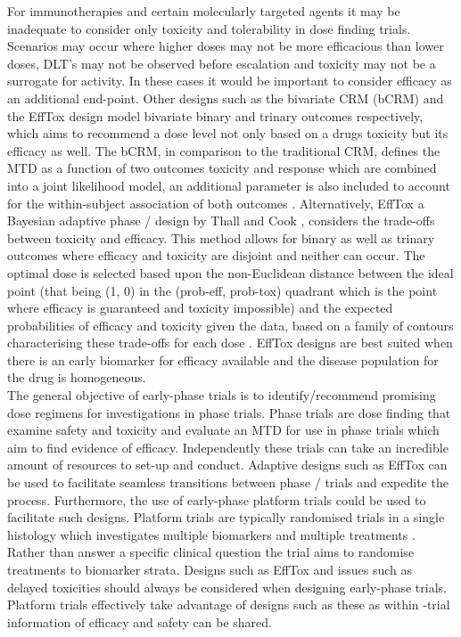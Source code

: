 \documentclass[a4paper, 11pt]{article} %
\newcommand{\RN}[1]{
	\textup{\uppercase\expandafter{\romannumeral#1}}} %
\begin{document}
\noindent For immunotherapies and certain molecularly targeted agents it may be inadequate to consider only toxicity and tolerability in dose finding trials. Scenarios may occur where higher doses may not be more efficacious than lower doses, DLT's may not be observed before escalation and toxicity may not be a surrogate for activity. In these cases it would be important to consider efficacy as an additional end-point. Other designs such as the bivariate CRM (bCRM) and the EffTox design model bivariate binary and trinary outcomes respectively, which aims to recommend a dose level not only based on a drugs toxicity but its efficacy as well. The bCRM, in comparison to the traditional CRM, defines the MTD as a function of two outcomes toxicity and response which are combined into a joint likelihood model, an additional parameter is also included to account for the within-subject association of both outcomes \cite{Braun2002}. Alternatively, EffTox a Bayesian adaptive phase\RN{1} /\RN{2} design by Thall and Cook \cite{Thall2004}, considers the trade-offs between toxicity and efficacy. This method allows for binary as well as trinary outcomes where efficacy and toxicity are disjoint and neither can occur. The optimal dose is selected based upon the non-Euclidean distance between the ideal point (that being (1, 0) in the (prob-eff, prob-tox) quadrant which is the point where efficacy is guaranteed and toxicity impossible) and the expected probabilities of efficacy and toxicity given the data, based on a family of contours characterising these trade-offs for each dose \cite{Thall2004}. EffTox designs are best suited when there is an early biomarker for efficacy available and the disease population for the drug is homogeneous. \\ 

\noindent The general objective of early-phase trials is to identify/recommend promising dose regimens for investigations in phase\RN{3} trials. Phase\RN{1} trials are dose finding that examine safety and toxicity and evaluate an MTD for use in phase\RN{2} trials which aim to find evidence of efficacy. Independently these trials can take an incredible amount of resources to set-up and conduct. Adaptive designs such as EffTox can be used to facilitate seamless transitions between phase\RN{1} /\RN{2} trials and expedite the process. Furthermore, the use of early-phase platform trials could be used to facilitate such designs. Platform trials are typically randomised trials in a single histology which investigates multiple biomarkers and multiple treatments \cite{Polley2019}. Rather than answer a specific clinical question the trial aims to randomise treatments to biomarker strata. Designs such as EffTox and issues such as delayed toxicities should always be considered when designing early-phase trials. Platform trials effectively take advantage of designs such as these as within -trial information of efficacy and safety can be shared.   \\     
\end{document}
